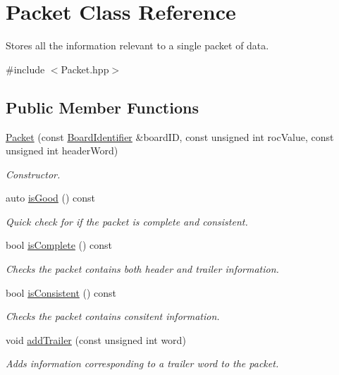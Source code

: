 \hypertarget{class_packet}{}\section{Packet Class Reference}
\label{class_packet}


Stores all the information relevant to a single packet of data.  




{\ttfamily \#include $<$Packet.\+hpp$>$}

\subsection*{Public Member Functions}
\begin{DoxyCompactItemize}
\item 
\hyperlink{class_packet_a36ed85cfdddceb45fbeff46c3514f17e}{Packet} (const \hyperlink{class_board_identifier}{Board\+Identifier} \&board\+ID, const unsigned int roc\+Value, const unsigned int header\+Word)
\begin{DoxyCompactList}\small\item\em Constructor. \end{DoxyCompactList}\item 
auto \hyperlink{class_packet_a19762fa917b80da872ecff9cbb389509}{is\+Good} () const
\begin{DoxyCompactList}\small\item\em Quick check for if the packet is complete and consistent. \end{DoxyCompactList}\item 
bool \hyperlink{class_packet_a6b5ce354c03663c98cccd31ad9a6f5ff}{is\+Complete} () const
\begin{DoxyCompactList}\small\item\em Checks the packet contains both header and trailer information. \end{DoxyCompactList}\item 
bool \hyperlink{class_packet_a8d9e544f6f56389fa13bb01b2d37ca58}{is\+Consistent} () const
\begin{DoxyCompactList}\small\item\em Checks the packet contains consitent information. \end{DoxyCompactList}\item 
void \hyperlink{class_packet_a13eccb2f6b6d527549839579920e5105}{add\+Trailer} (const unsigned int word)
\begin{DoxyCompactList}\small\item\em Adds information corresponding to a trailer word to the packet. \end{DoxyCompactList}\item 

\end{DoxyCompactItemize}
